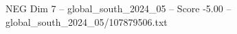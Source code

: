 \begin{textsample}{NEG Dim 7 – global\_south\_2024\_05 – Score -5.00 – global\_south\_2024\_05/107879506.txt}
\end{textsample}
